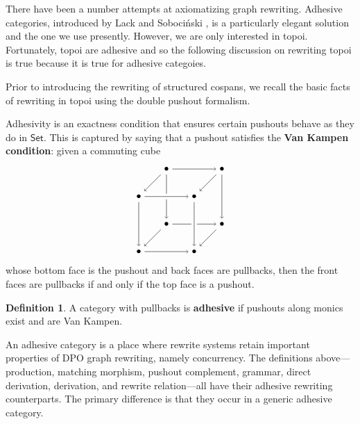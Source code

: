 \documentclass{amsart}
\newcommand{\Set}{\cat{Set}}
\newcommand{\defn}[1]{\textbf{#1}}
\newcommand{\cat}[1]{\mathsf{#1}}
\theoremstyle{remark}
\theoremstyle{definition}
\newtheorem{definition}[theorem]{Definition}
\begin{document}
There have been a number attempts at axiomatizing graph
rewriting. Adhesive categories, introduced by Lack and Soboci\'{n}ski
\cite{LackSobo_Adhesive}, is a particularly elegant solution and the
one we use presently. However, we are only interested in topoi.
Fortunately, topoi are adhesive \cite{LackSobo_ToposIsAdh} and so the
following discussion on rewriting topoi is true because it is true for
adhesive categoies.  

Prior to introducing the rewriting of structured cospans, we recall
the basic facts of rewriting in topoi using the double pushout formalism.

Adhesivity is an exactness condition that ensures certain pushouts
behave as they do in $ \Set $. This is captured by saying that a
pushout satisfies the \defn{Van Kampen condition}: given a commuting cube
%
\[
  \begin{tikzpicture}
    \node (1) at (1,3) {\( \bullet \)};
    \node (2) at (0,2) {\( \bullet \)};
    \node (3) at (3,3) {\( \bullet \)};
    \node (4) at (2,2) {\( \bullet \)};
    \node (5) at (1,1) {\( \bullet \)};
    \node (6) at (0,0) {\( \bullet \)};
    \node (7) at (3,1) {\( \bullet \)};
    \node (8) at (2,0) {\( \bullet \)};
    \draw [->] (1) to node [] {\scriptsize{\(  \)}} (5);
    \draw [->] (1) to node [] {\scriptsize{\(  \)}} (2);
    \draw [->] (1) to node [] {\scriptsize{\(  \)}} (3);
    \draw [white, line width=2mm] (2) -- (4);
    \draw [->] (2) to node [] {\scriptsize{\(  \)}} (4);
    \draw [->] (3) to node [] {\scriptsize{\(  \)}} (4);
    \draw [->] (5) to node [] {\scriptsize{\(  \)}} (6);
    \draw [->] (5) to node [] {\scriptsize{\(  \)}} (7);
    \draw [->] (6) to node [] {\scriptsize{\(  \)}} (8);
    \draw [->] (7) to node [] {\scriptsize{\(  \)}} (8);
    \draw [->] (2) to node [] {\scriptsize{\(  \)}} (6);
    \draw [->] (3) to node [] {\scriptsize{\(  \)}} (7);
    \draw [white, line width=2mm] (4) -- (8);
    \draw [->] (4) to node [] {\scriptsize{\(  \)}} (8);
  \end{tikzpicture}
\]
% 
whose bottom face is the pushout and back faces are pullbacks, then
the front faces are pullbacks if and only if the top face is a pushout.

\begin{definition} \label{dfn:adhesive-category} 
  A category with pullbacks is \defn{adhesive} if pushouts along
  monics exist and are Van Kampen.
\end{definition} 

An adhesive category is a place where rewrite systems retain important
properties of DPO graph rewriting, namely concurrency. The definitions
above---production, matching morphism, pushout complement, grammar,
direct derivation, derivation, and rewrite relation---all have their
adhesive rewriting counterparts.  The primary difference is that they
occur in a generic adhesive category.
\end{document}
